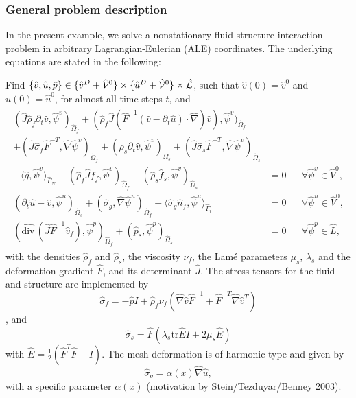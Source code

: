 \subsubsection{General problem description}

In the present example, we solve a 
nonstationary fluid-structure interaction problem in 
arbitrary Lagrangian-Eulerian (ALE) coordinates. 
The underlying equations are stated in the following:
\begin{Problem}
  \label{eq:fsi:ale:harmonic}
  Find $\{\hat v,\hat u,\hat p\} \in \{ \hat v^D + \hat {\cal V}^0\} 
\times \{ \hat u^D + \hat {\cal V}^0 \}\times \hat {\cal L}$, 
  such that $\hat v (0) = \hat v^0$ and $\hat u(0) = \hat u^0$, for almost all
  time steps $t$, and
  \begin{eqnarray*}
    \begin{aligned}
      (\hat J\hat\rho_f  \partial_t \hat v,\hat\psi^v)_{\hat\Omega_f}  
      +(\hat\rho_f \hat J  (\hat F^{-1}(\hat
      v-\partial_t \hat u)\cdot\hat\nabla) \hat v),
      \hat\psi^v)_{\hat\Omega_f} &\\
      + (\hat J\hat\sigma_f\hat
      F^{-T},\hat\nabla\hat\psi^v)_{\hat\Omega_f}
      + (\hat\rho_s \partial_t \hat v,\hat\psi^v)_{\Omega_s}  
      + (\hat J\hat\sigma_s\hat F^{-T},\hat\nabla\hat\psi^v)_{\hat\Omega_s}&\\
      - \langle \hat g, \hat\psi^v \rangle_{\hat\Gamma_N} -
      (\hat\rho_f \hat J\hat f_f, \hat\psi^v)_{\hat\Omega_f}
      - (\hat\rho_s\hat f_s, \hat\psi^v)_{\hat\Omega_s}
      &=0&&\forall\hat\psi^v\in \hat V^0,
      \\
      (\partial_t\hat u-\hat v,\hat\psi^u)_{\hat\Omega_s} 
      + 
      (\hat\sigma_g ,\hat \nabla\hat\psi^u)_{\hat\Omega_f}
      -\langle \hat\sigma_g \hat n_f ,\hat\psi^u\rangle_{\hat \Gamma_i}
      &=0&&\forall\hat\psi^u\in \hat V^0,\\
      (\widehat{\text{div}}\,(\hat J\hat F^{-1}
      \hat v_f),\hat\psi^p)_{\hat\Omega_f} 
      + (\hat p_s ,\hat \psi^p)_{\hat\Omega_s}
      &=0&&\forall\hat\psi^p\in \hat L,
    \end{aligned}
  \end{eqnarray*}  
  with the densities $\hat\rho_f$ and $\hat\rho_s$, 
the viscosity $\nu_f$, the Lam\'e parameters 
$\mu_s$, $\lambda_s$ and the deformation gradient $\hat F$, and its
determinant $\hat J$. The stress tensors for the fluid and structure are
implemented by 
\[
\hat\sigma_f = -\hat pI + \hat\rho_f\nu_f (\hat\nabla\hat v \hat F^{-1}
  + \hat F^{-T} \hat\nabla\hat v^T)
\], 
and 
\[
\hat\sigma_s = \hat F (\lambda_s \text{tr}\hat E I + 2\mu_s \hat E)
\]
with $\hat E = \frac{1}{2}(\hat F^T \hat F - I)$.
The mesh deformation
is of harmonic type and given by 
\[
\hat\sigma_g = \alpha(x) \hat\nabla\hat u,
\] 
with a specific parameter $\alpha(x)$ (motivation by Stein/Tezduyar/Benney 2003).
\end{Problem}
